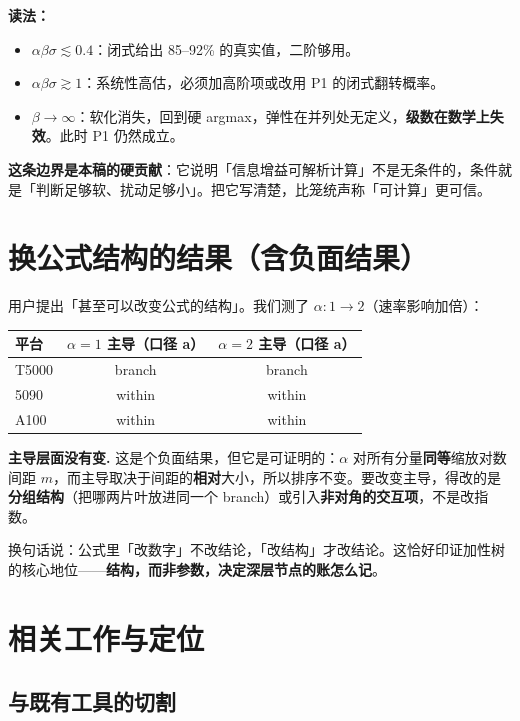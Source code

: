 \documentclass[12pt]{ctexart}
\begin{document}
\textbf{读法：}
\begin{itemize}
  \item $\alpha\beta\sigma\lesssim0.4$：闭式给出 85--92\% 的真实值，二阶够用。
  \item $\alpha\beta\sigma\gtrsim1$：系统性高估，必须加高阶项或改用 P1 的闭式翻转概率。
  \item $\beta\to\infty$：软化消失，回到硬 argmax，弹性在并列处无定义，\textbf{级数在数学上失效}。此时 P1 仍然成立。
\end{itemize}

\textbf{这条边界是本稿的硬贡献}：它说明「信息增益可解析计算」不是无条件的，条件就是「判断足够软、扰动足够小」。把它写清楚，比笼统声称「可计算」更可信。

\section{换公式结构的结果（含负面结果）}
\label{sec:structure}

用户提出「甚至可以改变公式的结构」。我们测了 $\alpha:1\to2$（速率影响加倍）：

\begin{table}[htbp]
\centering\small
\begin{tabular}{@{}lcc@{}}
\toprule
平台 & $\alpha=1$ 主导（口径 a） & $\alpha=2$ 主导（口径 a） \\
\midrule
T5000 & branch & branch \\
5090  & within & within \\
A100  & within & within \\
\bottomrule
\end{tabular}
\end{table}

\textbf{主导层面没有变.} 这是个负面结果，但它是可证明的：$\alpha$ 对所有分量\textbf{同等}缩放对数间距 $m$，而主导取决于间距的\textbf{相对}大小，所以排序不变。要改变主导，得改的是\textbf{分组结构}（把哪两片叶放进同一个 branch）或引入\textbf{非对角的交互项}，不是改指数。

换句话说：公式里「改数字」不改结论，「改结构」才改结论。这恰好印证加性树的核心地位——\textbf{结构，而非参数，决定深层节点的账怎么记}。

\section{相关工作与定位}
\label{sec:related}

\subsection{与既有工具的切割}
\end{document}
